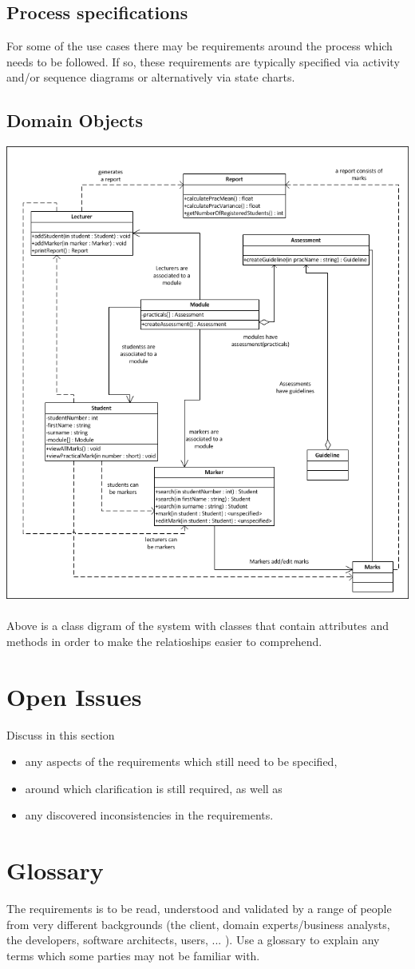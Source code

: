 \documentclass[11pt,a4paper]{article}
\begin{document}
\subsection{Process specifications}
For some of the use cases there may be requirements around the process which needs to be followed. If so, these requirements are typically specified via activity and/or sequence diagrams or
alternatively via state charts.
\subsection{Domain Objects}
\includegraphics[width=1.0\linewidth]{Class_Diagram}
\\\\
Above is a class digram of the system with classes that contain attributes and methods in order to make the relatioships easier to comprehend. 
\section{Open Issues}
Discuss in this section
\begin{itemize}
	\item any aspects of the requirements which still need to be specified,
	\item around which clarification is still required, as well as
	\item any discovered inconsistencies in the requirements.
\end{itemize}
\section{Glossary}
The requirements is to be read, understood and validated by a range of people from very different backgrounds (the client, domain experts/business analysts, the developers, software architects, users, ... ). Use a glossary to explain any terms which some parties may not be familiar with.
\end{document}
